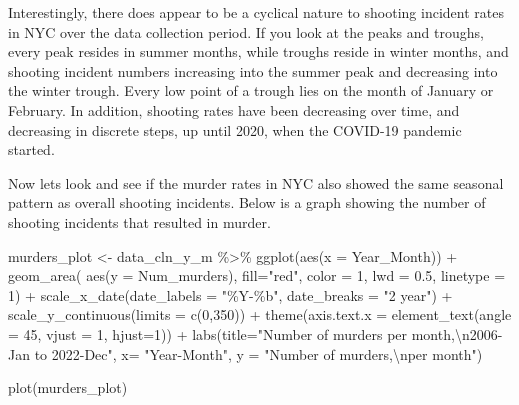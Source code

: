 \documentclass[
]{article}
\newenvironment{Shaded}{\begin{snugshade}}{\end{snugshade}}
\newcommand{\AttributeTok}[1]{\textcolor[rgb]{0.77,0.63,0.00}{#1}}
\newcommand{\DecValTok}[1]{\textcolor[rgb]{0.00,0.00,0.81}{#1}}
\newcommand{\FloatTok}[1]{\textcolor[rgb]{0.00,0.00,0.81}{#1}}
\newcommand{\FunctionTok}[1]{\textcolor[rgb]{0.00,0.00,0.00}{#1}}
\newcommand{\NormalTok}[1]{#1}
\newcommand{\OtherTok}[1]{\textcolor[rgb]{0.56,0.35,0.01}{#1}}
\newcommand{\SpecialCharTok}[1]{\textcolor[rgb]{0.00,0.00,0.00}{#1}}
\newcommand{\StringTok}[1]{\textcolor[rgb]{0.31,0.60,0.02}{#1}}
\begin{document}
Interestingly, there does appear to be a cyclical nature to shooting
incident rates in NYC over the data collection period. If you look at
the peaks and troughs, every peak resides in summer months, while
troughs reside in winter months, and shooting incident numbers
increasing into the summer peak and decreasing into the winter trough.
Every low point of a trough lies on the month of January or February. In
addition, shooting rates have been decreasing over time, and decreasing
in discrete steps, up until 2020, when the COVID-19 pandemic started.

Now lets look and see if the murder rates in NYC also showed the same
seasonal pattern as overall shooting incidents. Below is a graph showing
the number of shooting incidents that resulted in murder.

\begin{Shaded}
\begin{Highlighting}[]
\NormalTok{murders\_plot }\OtherTok{\textless{}{-}}\NormalTok{ data\_cln\_y\_m }\SpecialCharTok{\%\textgreater{}\%} \FunctionTok{ggplot}\NormalTok{(}\FunctionTok{aes}\NormalTok{(}\AttributeTok{x =}\NormalTok{ Year\_Month)) }\SpecialCharTok{+} \FunctionTok{geom\_area}\NormalTok{( }\FunctionTok{aes}\NormalTok{(}\AttributeTok{y =}\NormalTok{ Num\_murders), }\AttributeTok{fill=}\StringTok{"red"}\NormalTok{, }\AttributeTok{color =} \DecValTok{1}\NormalTok{, }\AttributeTok{lwd =} \FloatTok{0.5}\NormalTok{, }\AttributeTok{linetype =} \DecValTok{1}\NormalTok{) }\SpecialCharTok{+} \FunctionTok{scale\_x\_date}\NormalTok{(}\AttributeTok{date\_labels =} \StringTok{"\%Y{-}\%b"}\NormalTok{, }\AttributeTok{date\_breaks =} \StringTok{"2 year"}\NormalTok{) }\SpecialCharTok{+} \FunctionTok{scale\_y\_continuous}\NormalTok{(}\AttributeTok{limits =} \FunctionTok{c}\NormalTok{(}\DecValTok{0}\NormalTok{,}\DecValTok{350}\NormalTok{)) }\SpecialCharTok{+} \FunctionTok{theme}\NormalTok{(}\AttributeTok{axis.text.x =} \FunctionTok{element\_text}\NormalTok{(}\AttributeTok{angle =} \DecValTok{45}\NormalTok{, }\AttributeTok{vjust =} \DecValTok{1}\NormalTok{, }\AttributeTok{hjust=}\DecValTok{1}\NormalTok{)) }\SpecialCharTok{+} \FunctionTok{labs}\NormalTok{(}\AttributeTok{title=}\StringTok{"Number of murders per month,}\SpecialCharTok{\textbackslash{}n}\StringTok{2006{-}Jan to 2022{-}Dec"}\NormalTok{, }\AttributeTok{x=} \StringTok{"Year{-}Month"}\NormalTok{, }\AttributeTok{y =} \StringTok{"Number of murders,}\SpecialCharTok{\textbackslash{}n}\StringTok{per month"}\NormalTok{)}

\FunctionTok{plot}\NormalTok{(murders\_plot)}
\end{Highlighting}
\end{Shaded}
\end{document}
